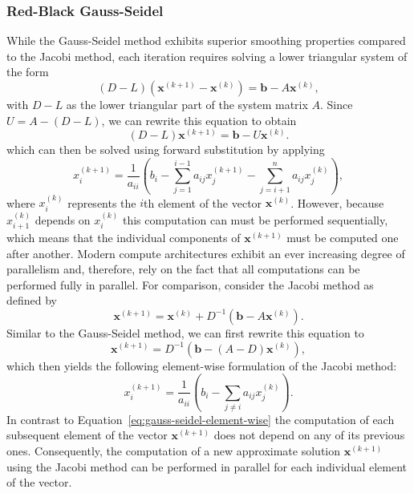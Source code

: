 \subsubsection{Red-Black Gauss-Seidel}
\label{sec:rb-gs}
While the Gauss-Seidel method exhibits superior smoothing properties compared to the Jacobi method, each iteration requires solving a lower triangular system of the form
\begin{equation*}
	(D - L) (\bm{x}^{(k+1)} - \bm{x}^{(k)}) = \bm{b} - A \bm{x}^{(k)},
\end{equation*}
with $D - L$ as the lower triangular part of the system matrix $A$.
Since $U = A - (D - L)$, we can rewrite this equation to obtain
\begin{equation*}
	(D - L) \bm{x}^{(k+1)} = \bm{b} - U \bm{x}^{(k)}.
\end{equation*}  
which can then be solved using forward substitution by applying
\begin{equation}
	x_{i}^{(k+1)}={\frac {1}{a_{ii}}}\left(b_{i}-\sum _{j=1}^{i-1}a_{ij}x_{j}^{(k+1)}-\sum _{j=i+1}^{n}a_{ij}x_{j}^{(k)}\right),
	\label{eq:gauss-seidel-element-wise}
\end{equation}
where $x_{i}^{(k)}$ represents the $i$th element of the vector $\bm{x}^{(k)}$.
However, because $x_{i+1}^{(k)}$ depends on $x_{i}^{(k)}$ this computation can must be performed sequentially, which means that the individual components of $\bm{x}^{(k+1)}$ must be computed one after another. 
Modern compute architectures exhibit an ever increasing degree of parallelism and, therefore, rely on the fact that all computations can be performed fully in parallel.
For comparison, consider the Jacobi method as defined by 
\begin{equation*}
	\bm{x}^{(k+1)} = \bm{x}^{(k)} + D^{-1}(\bm b - A \bm{x}^{(k)}).
\end{equation*}
Similar to the Gauss-Seidel method, we can first rewrite this equation to
\begin{equation*}
	\bm{x}^{(k+1)} = D^{-1}(\bm b - (A - D)\bm{x}^{(k)}),
\end{equation*}
which then yields the following element-wise formulation of the Jacobi method:
\begin{equation}
x_{i}^{(k+1)}={\frac {1}{a_{ii}}}\left(b_{i}-\sum _{j\neq i}a_{ij}x_{j}^{(k)}\right).
	\label{eq:jacobi-element-wise}
\end{equation}
In contrast to Equation~\eqref{eq:gauss-seidel-element-wise} the computation of each subsequent element of the vector $\bm{x}^{(k+1)}$ does not depend on any of its previous ones.
Consequently, the computation of a new approximate solution $\bm{x}^{(k+1)}$ using the Jacobi method can be performed in parallel for each individual element of the vector.

